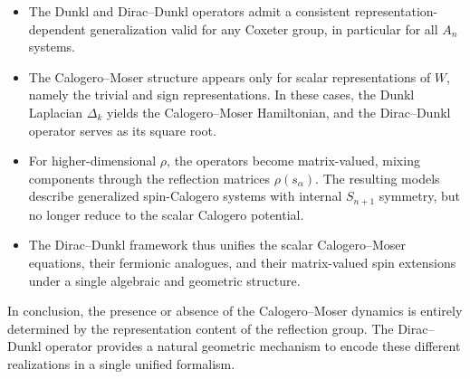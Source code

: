 \documentclass[12pt]{article}
\newcommand{\1}{\mathbbm{1}}
\theoremstyle{definition}
\begin{document}
\begin{itemize}
\item The Dunkl and Dirac--Dunkl operators admit a consistent
representation-dependent generalization valid for any Coxeter group, in
particular for all $A_n$ systems.

\item The {Calogero--Moser structure} appears only for scalar
representations of $W$, namely the trivial and sign representations.
In these cases, the Dunkl Laplacian $\Delta_k$ yields the
Calogero--Moser Hamiltonian, and the Dirac--Dunkl operator serves as its
square root.

\item For higher-dimensional $\rho$, the operators become
{matrix-valued}, mixing components through the reflection matrices
$\rho(s_\alpha)$.  The resulting models describe generalized
{spin-Calogero systems} with internal $S_{n+1}$ symmetry, but no longer
reduce to the scalar Calogero potential.

\item The Dirac--Dunkl framework thus unifies the scalar Calogero--Moser
equations, their fermionic analogues, and their matrix-valued spin
extensions under a single algebraic and geometric structure.
\end{itemize}

\smallskip

In conclusion, the presence or absence of the Calogero--Moser dynamics is
entirely determined by the representation content of the reflection group.
The Dirac--Dunkl operator provides a natural geometric mechanism to encode
these different realizations in a single unified formalism.
\end{document}
